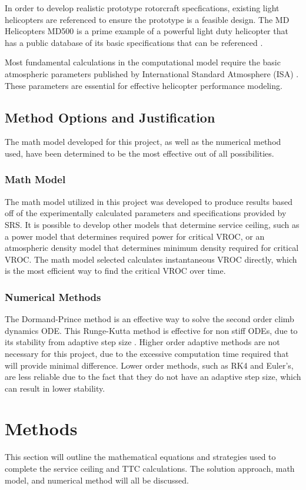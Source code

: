 \documentclass[12pt]{report}
\begin{document}
In order to develop realistic prototype rotorcraft specfications, existing light helicopters are referenced to ensure the
prototype is a feasible design. The MD Helicopters MD500 is a prime example of a powerful light duty helicopter that has a
public database of its basic specifications that can be referenced \cite{md500}.

Most fundamental calculations in the computational model require the basic atmospheric parameters published by International
Standard Atmosphere (ISA) \cite{ISA}. These parameters are essential for effective helicopter performance modeling.

\section{Method Options and Justification}
The math model developed for this project, as well as the numerical method used, have been determined to be the most effective
out of all possibilities.

\subsection{Math Model}
The math model utilized in this project was developed to produce results based off of the experimentally calculated parameters and
specifications provided by SRS. It is possible to develop other models that determine service ceiling, such as a power model
that determines required power for critical VROC, or an atmospheric density model that determines minimum density required for 
critical VROC. The math model selected calculates instantaneous VROC directly, which is the most efficient way to find the critical
VROC over time.

\subsection{Numerical Methods}
The Dormand-Prince method is an effective way to solve the second order climb dynamics ODE.
This Runge-Kutta method is effective for non stiff ODEs, due to its stability from adaptive step size \cite{dormandprince}.
Higher order adaptive methods are not necessary for this project, due to the excessive computation time required that will
provide minimal difference. Lower order methods, such as RK4 and Euler's, are less reliable due to the fact that they do not have an adaptive step size, which
can result in lower stability.

\chapter{Methods} 
This section will outline the mathematical equations and strategies used to complete the service ceiling and TTC calculations.
The solution approach, math model, and numerical method will all be discussed.
\end{document}
